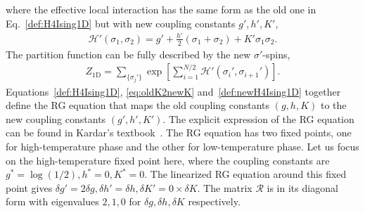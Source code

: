 \documentclass[aps,prr,reprint,superscriptaddress,nofootinbib,floatfix]{revtex4-2}
\begin{document}
%
where the effective local interaction has the same form as the old one in Eq.~\eqref{def:H4Ising1D} but with new coupling constants $g',h',K'$,
%
\begin{align}\label{def:newH4Ising1D}
    \mathscr{H}'\left(\sigma_1,\sigma_2\right) = g' +
    \frac{h'}{2}\left(\sigma_1 + \sigma_2\right) + K' \sigma_1 \sigma_2.
\end{align}
%
The partition function can be fully described by the new $\sigma'$-spins,
%
\begin{align}\label{eq:Z2Ising1Dnew}
    Z_{\text{1D}} = \sum_{\{\sigma_j'\}}
    \exp{\left[\sum_{i=1}^{N/2}\mathscr{H}'\left(\sigma_i',\sigma_{i+1}'\right)\right]}.
\end{align}
%
Equations~\eqref{def:H4Ising1D}, \eqref{eq:oldK2newK} and~\eqref{def:newH4Ising1D} together define the RG equation that maps the old coupling constants $(g,h,K)$ to the new coupling constants $(g',h',K')$. 
The explicit expression of the RG equation can be found in Kardar's textbook~\cite{kardar2007}. 
The RG equation has two fixed points, one for high-temperature phase and the other for low-temperature phase. 
Let us focus on the high-temperature fixed point here, where the coupling constants are $g^* = \log\left(1/2\right),h^*=0,K^*=0$. 
The linearized RG equation around this fixed point gives $\delta g' = 2\delta g, \delta h' = \delta h, \delta K' = 0\times \delta K$. 
The matrix $\mathcal{R}$ is in its diagonal form with eigenvalues $2,1,0$ for $\delta g,\delta h,\delta K$ respectively.
%
\end{document}
